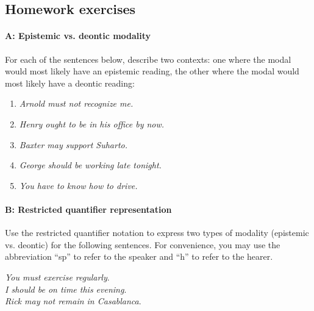 \subsection*{Homework exercises}
\paragraph*{A: Epistemic vs. deontic modality}

For each of the sentences below, describe two contexts: one where the modal would most likely have an epistemic reading, the other where the modal would most likely have a deontic reading:

\begin{enumerate}
\item \itshape Arnold must not recognize me.
\item \itshape Henry ought to be in his office by now.
\item \itshape Baxter may support Suharto.
\item \itshape George should be working late tonight.
\item \itshape You have to know how to drive.
\end{enumerate}
\paragraph*{B: Restricted quantifier representation}

Use the restricted quantifier notation to express two types of modality (epistemic vs. deontic) for the following sentences. For convenience, you may use the abbreviation “sp” to refer to the speaker and “h” to refer to the hearer.

\ea 
\ea 
\textit{You must exercise regularly}.\\
\ex \textit{I should be on time this evening}.\\
\ex \textit{Rick may not remain in Casablanca}.
\z
\z

